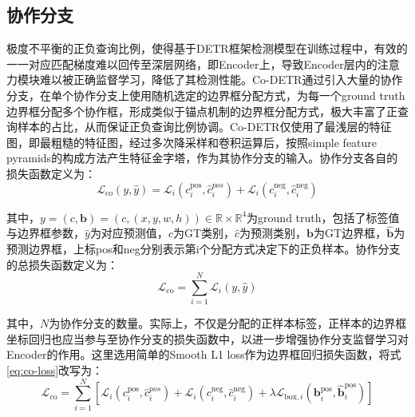 \subsection{协作分支}
极度不平衡的正负查询比例，使得基于DETR框架检测模型在训练过程中，有效的一一对应匹配梯度难以回传至深层网络，即Encoder上，导致Encoder层内的注意力模块难以被正确监督学习，降低了其检测性能。Co-DETR\cite{zongDETRsCollaborativeHybrid2023}通过引入大量的协作分支，在单个协作分支上使用随机选定的边界框分配方式，为每一个ground truth边界框分配多个协作框，形成类似于锚点机制的边界框分配方式，极大丰富了正查询样本的占比，从而保证正负查询比例协调。Co-DETR仅使用了最浅层的特征图，即最粗糙的特征图，经过多次降采样和卷积运算后，按照simple feature pyramids\cite{liExploringPlainVision2022}的构成方法产生特征金字塔，作为其协作分支的输入。协作分支各自的损失函数定义为：
\begin{equation}
  \mathcal{L}_\text{co}(y,\hat{y}) = \mathcal{L}_i(c^\text{pos}_i,\hat{c}_i^{pos})+\mathcal{L}_i(c^\text{neg}_i, \hat{c}_i^\text{neg})
\end{equation}\par
其中，$y=(c,\mathbf{b})=(c,(x,y,w,h))\in\mathbb{R}\times\mathbb{R}^{4}$为ground truth，包括了标签值与边界框参数，$\hat{y}$为对应预测值，$c$为GT类别，$\hat{c}$为预测类别，$\mathbf{b}$为GT边界框，$\mathbf{\hat{b}}$为预测边界框，上标pos和neg分别表示第i个分配方式决定下的正负样本。协作分支的总损失函数定义为：
\begin{equation}
  \mathcal{L}_\text{co} = \sum_{i=1}^{N}\mathcal{L}_i(y,\hat{y})
  \label{eq:co-loss}
\end{equation}\par
其中，$N$为协作分支的数量。实际上，不仅是分配的正样本标签，正样本的边界框坐标回归也应当参与至协作分支的损失函数中，以进一步增强协作分支监督学习对Encoder的作用。这里选用简单的Smooth L1 loss作为边界框回归损失函数，将式\ref{eq:co-loss}改写为：
\begin{equation}
  \mathcal{L}_\text{co} = \sum_{i=1}^{N}\left[\mathcal{L}_i(c^\text{pos}_i,\hat{c}_i^{pos})+\mathcal{L}_i(c^\text{neg}_i, \hat{c}_i^\text{neg})+\lambda\mathcal{L}_{\text{box},i}(\mathbf{b}^\text{pos}_i,\mathbf{\hat{b}}_i^\text{pos})\right]
  \label{eq:co-loss-reg}
\end{equation}\par
